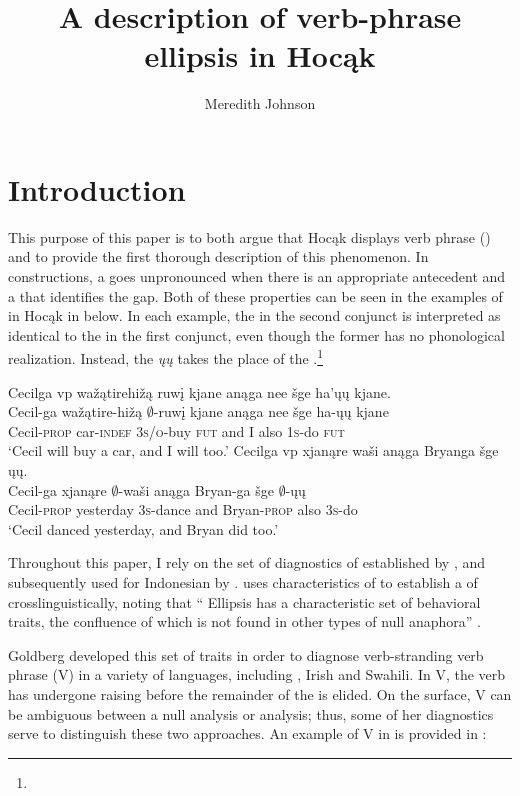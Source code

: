 \documentclass[output=paper]{LSP/langsci}
\author{Meredith Johnson}
\title{A description of verb-phrase ellipsis in {Hocąk}}
\begin{document}
\section{Introduction}\label{sec:johnson:1}

This purpose of this paper is to both argue that Hocąk displays verb phrase  () and to provide the first thorough description of this phenomenon. In  constructions, a  goes unpronounced when there is an appropriate antecedent  and a  that identifies the gap. Both of these properties can be seen in the examples of  in Hocąk in  below. In each example, the  in the second conjunct is interpreted as identical to the  in the first conjunct, even though the former has no phonological realization. Instead, the  \emph{ųų} takes the place of the .\footnote{}


\ea\label{ex:johnson:1}
\ea
\glll Cecilga {\ob}{vp} wažątirehižą ruwį{\cb} kjane anąga nee šge {\ob}ha'ųų{\cb} kjane.\\
Cecil-ga {} wažątire-hižą {$\emptyset$}-ruwį kjane anąga nee šge ha-ųų kjane\\
Cecil-\textsc{prop} {} car-\textsc{indef} \textsc{3s/o}-buy \textsc{fut} and I also \textsc{1s}-do \textsc{fut}\\
\trans `Cecil will buy a car, and I will too.' 
\ex
\glll Cecilga {\ob}{vp} xjanąre waši{\cb} anąga Bryanga šge {\ob}ųų{\cb}.\\
Cecil-ga {} xjanąre {$\emptyset$}-waši anąga Bryan-ga šge {$\emptyset$}-ųų\\
Cecil-\textsc{prop} {} yesterday \textsc{3s}-dance and Bryan-\textsc{prop} also \textsc{3s}-do\\
\trans `Cecil danced yesterday, and Bryan did too.'
\z
\z

Throughout this paper, I rely on the set of diagnostics of  established by \citet{Goldberg2005}, and subsequently used for Indonesian by \citet{Fortin2007}. \citet{Goldberg2005} uses characteristics of   to establish a  of  crosslinguistically, noting that ``  Ellipsis has a characteristic set of behavioral traits, the confluence of which is not found in other types of null anaphora'' \citep[27]{Goldberg2005}. 

Goldberg developed this set of traits in order to diagnose verb-stranding verb phrase  (V) in a variety of languages, including , Irish and Swahili. In V, the verb has undergone raising before the remainder of the  is elided. On the surface, V can be ambiguous between a null  analysis or  analysis; thus, some of her diagnostics serve to distinguish these two approaches. An example of V in  is provided in :
 
\end{document}
